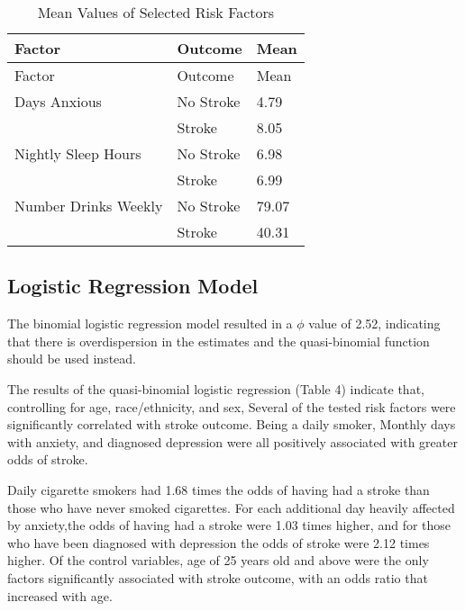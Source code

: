 \documentclass[11pt,]{article}
\begin{document}
\begin{longtable}[]{@{}lll@{}}
\caption{Mean Values of Selected Risk Factors}\tabularnewline
\toprule
Factor & Outcome & Mean\tabularnewline
\midrule
\endfirsthead
\toprule
Factor & Outcome & Mean\tabularnewline
\midrule
\endhead
Days Anxious & No Stroke & 4.79\tabularnewline
& Stroke & 8.05\tabularnewline
Nightly Sleep Hours & No Stroke & 6.98\tabularnewline
& Stroke & 6.99\tabularnewline
Number Drinks Weekly & No Stroke & 79.07\tabularnewline
& Stroke & 40.31\tabularnewline
\bottomrule
\end{longtable}

\subsection{Logistic Regression
Model}\label{logistic-regression-model-1}

The binomial logistic regression model resulted in a \(\phi\) value of
2.52, indicating that there is overdispersion in the estimates and the
quasi-binomial function should be used instead.

The results of the quasi-binomial logistic regression (Table 4) indicate
that, controlling for age, race/ethnicity, and sex, Several of the
tested risk factors were significantly correlated with stroke outcome.
Being a daily smoker, Monthly days with anxiety, and diagnosed
depression were all positively associated with greater odds of stroke.

Daily cigarette smokers had 1.68 times the odds of having had a stroke
than those who have never smoked cigarettes. For each additional day
heavily affected by anxiety,the odds of having had a stroke were 1.03
times higher, and for those who have been diagnosed with depression the
odds of stroke were 2.12 times higher. Of the control variables, age of
25 years old and above were the only factors significantly associated
with stroke outcome, with an odds ratio that increased with age.
\end{document}
